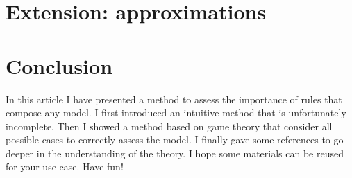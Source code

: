 \section{Extension: approximations}

\label{sec:extension-approximation}


\section{Conclusion}

\label{sec:conclusion}

In this article I have presented a method to assess the importance of rules that compose any model. I first introduced an intuitive method that is unfortunately incomplete. Then I showed a method based on game theory that consider all possible cases to correctly assess the model. I finally gave some references to go deeper in the understanding of the theory. I hope some materials can be reused for your use case. Have fun!


\vspace{10mm}